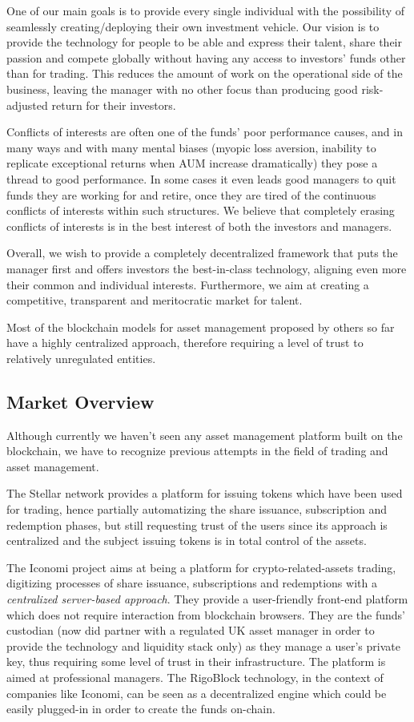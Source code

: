 \documentclass[9pt,oneside]{amsart}
\begin{document}
\begin{multicols}{2}
One of our main goals is to provide every single individual with the possibility of seamlessly creating/deploying their own investment vehicle. Our vision is to provide the technology for people to be able and express their talent, share their passion and compete globally without having any access to investors' funds other than for trading. This reduces the amount of work on the operational side of the business, leaving the manager with no other focus than producing good risk-adjusted return for their investors.

Conflicts of interests are often one of the funds' poor performance causes, and in many ways and with many mental biases (myopic loss aversion, inability to replicate exceptional returns when AUM increase dramatically) they pose a thread to good performance. In some cases it even leads good managers to quit funds they are working for and retire, once they are tired of the continuous conflicts of interests within such structures. We believe that completely erasing conflicts of interests is in the best interest of both the investors and managers.

Overall, we wish to provide a completely decentralized framework that puts the manager first and offers investors the best-in-class technology, aligning even more their common and individual interests. Furthermore, we aim at creating a competitive, transparent and meritocratic market for talent.

Most of the blockchain models for asset management proposed by others so far have a highly centralized approach, therefore requiring a level of trust to relatively unregulated entities.

\subsection{Market Overview} \label{ch:previous}

Although currently we haven't seen any asset management platform built on the blockchain, we have to recognize previous attempts in the field of trading and asset management.

The Stellar network provides a platform for issuing tokens which have been used for trading, hence partially automatizing the share issuance, subscription and redemption phases, but still requesting trust of the users since its approach is centralized and the subject issuing tokens is in total control of the assets.

The Iconomi project aims at being a platform for crypto-related-assets trading, digitizing processes of share issuance, subscriptions and redemptions with a \textit{centralized server-based approach}. They provide a user-friendly front-end platform which does not require interaction from blockchain browsers. They are the funds' custodian (now did partner with a regulated UK asset manager in order to provide the technology and liquidity stack only) as they manage a user’s private key, thus requiring some level of trust in their infrastructure. The platform is aimed at professional managers. The RigoBlock technology, in the context of companies like Iconomi, can be seen as a decentralized engine which could be easily plugged-in in order to create the funds on-chain.


\end{multicols}
\end{document}
